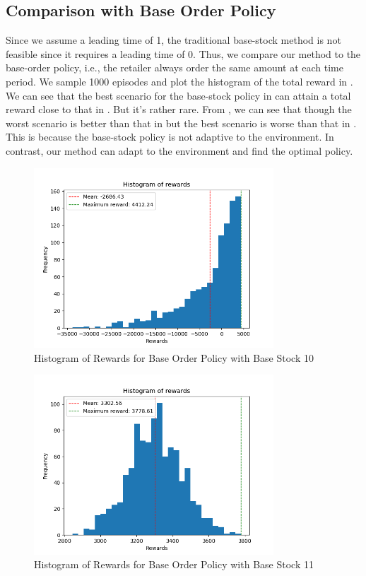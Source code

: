 \subsection{Comparison with Base Order Policy}
Since we assume a leading time of 1, the traditional base-stock method is not feasible since it requires a leading time of 0. Thus, we compare our method to the base-order policy, i.e., the retailer always order the same amount at each time period. We sample 1000 episodes and plot the histogram of the total reward in . We can see that the best scenario for the base-stock policy in  can attain a total reward close to that in . But it's rather rare. From , we can see that though the worst scenario is better than that in  but the best scenario is worse than that in . This is because the base-stock policy is not adaptive to the environment. In contrast, our method can adapt to the environment and find the optimal policy.
\begin{figure}[H]
    \centering
    \includegraphics[width=0.8\textwidth]{figure/Histogram of rewards - Base 10.png}
    \caption{Histogram of Rewards for Base Order Policy with Base Stock 10}
    \label{fig:hist-base-10}
\end{figure}
\begin{figure}[H]
    \centering
    \includegraphics[width=0.8\textwidth]{figure/Histogram of rewards - Base 11.png}
    \caption{Histogram of Rewards for Base Order Policy with Base Stock 11}
    \label{fig:hist-base-11}
\end{figure}
